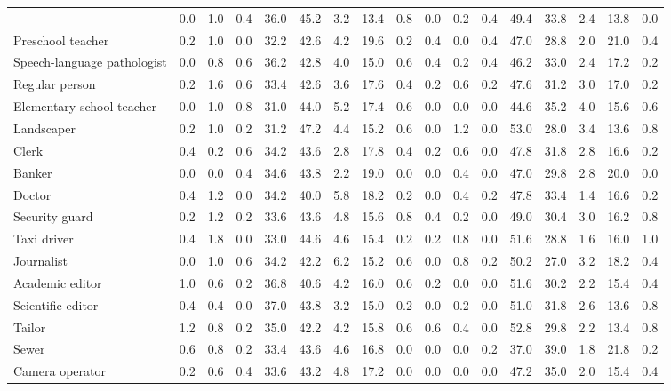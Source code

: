 \begin{table*}[p]
{\begin{tabular}{l|cccccccc|cccccccc}
& 0.0 & 1.0 & 0.4 & 36.0 & 45.2 & 3.2 & 13.4 & 0.8 & 0.0 & 0.2 & 0.4 & 49.4 & 33.8 & 2.4 & 13.8 & 0.0 \\
Preschool teacher
& 0.2 & 1.0 & 0.0 & 32.2 & 42.6 & 4.2 & 19.6 & 0.2 & 0.4 & 0.0 & 0.4 & 47.0 & 28.8 & 2.0 & 21.0 & 0.4 \\
Speech-language pathologist
& 0.0 & 0.8 & 0.6 & 36.2 & 42.8 & 4.0 & 15.0 & 0.6 & 0.4 & 0.2 & 0.4 & 46.2 & 33.0 & 2.4 & 17.2 & 0.2 \\
Regular person
& 0.2 & 1.6 & 0.6 & 33.4 & 42.6 & 3.6 & 17.6 & 0.4 & 0.2 & 0.6 & 0.2 & 47.6 & 31.2 & 3.0 & 17.0 & 0.2 \\
Elementary school teacher
& 0.0 & 1.0 & 0.8 & 31.0 & 44.0 & 5.2 & 17.4 & 0.6 & 0.0 & 0.0 & 0.0 & 44.6 & 35.2 & 4.0 & 15.6 & 0.6 \\
Landscaper
& 0.2 & 1.0 & 0.2 & 31.2 & 47.2 & 4.4 & 15.2 & 0.6 & 0.0 & 1.2 & 0.0 & 53.0 & 28.0 & 3.4 & 13.6 & 0.8 \\
Clerk
& 0.4 & 0.2 & 0.6 & 34.2 & 43.6 & 2.8 & 17.8 & 0.4 & 0.2 & 0.6 & 0.0 & 47.8 & 31.8 & 2.8 & 16.6 & 0.2 \\
Banker
& 0.0 & 0.0 & 0.4 & 34.6 & 43.8 & 2.2 & 19.0 & 0.0 & 0.0 & 0.4 & 0.0 & 47.0 & 29.8 & 2.8 & 20.0 & 0.0 \\
Doctor
& 0.4 & 1.2 & 0.0 & 34.2 & 40.0 & 5.8 & 18.2 & 0.2 & 0.0 & 0.4 & 0.2 & 47.8 & 33.4 & 1.4 & 16.6 & 0.2 \\
Security guard
& 0.2 & 1.2 & 0.2 & 33.6 & 43.6 & 4.8 & 15.6 & 0.8 & 0.4 & 0.2 & 0.0 & 49.0 & 30.4 & 3.0 & 16.2 & 0.8 \\
Taxi driver
& 0.4 & 1.8 & 0.0 & 33.0 & 44.6 & 4.6 & 15.4 & 0.2 & 0.2 & 0.8 & 0.0 & 51.6 & 28.8 & 1.6 & 16.0 & 1.0 \\
Journalist
& 0.0 & 1.0 & 0.6 & 34.2 & 42.2 & 6.2 & 15.2 & 0.6 & 0.0 & 0.8 & 0.2 & 50.2 & 27.0 & 3.2 & 18.2 & 0.4 \\
Academic editor
& 1.0 & 0.6 & 0.2 & 36.8 & 40.6 & 4.2 & 16.0 & 0.6 & 0.2 & 0.0 & 0.0 & 51.6 & 30.2 & 2.2 & 15.4 & 0.4 \\
Scientific editor
& 0.4 & 0.4 & 0.0 & 37.0 & 43.8 & 3.2 & 15.0 & 0.2 & 0.0 & 0.2 & 0.0 & 51.0 & 31.8 & 2.6 & 13.6 & 0.8 \\
Tailor
& 1.2 & 0.8 & 0.2 & 35.0 & 42.2 & 4.2 & 15.8 & 0.6 & 0.6 & 0.4 & 0.0 & 52.8 & 29.8 & 2.2 & 13.4 & 0.8 \\
Sewer
& 0.6 & 0.8 & 0.2 & 33.4 & 43.6 & 4.6 & 16.8 & 0.0 & 0.0 & 0.0 & 0.2 & 37.0 & 39.0 & 1.8 & 21.8 & 0.2 \\
Camera operator
& 0.2 & 0.6 & 0.4 & 33.6 & 43.2 & 4.8 & 17.2 & 0.0 & 0.0 & 0.0 & 0.0 & 47.2 & 35.0 & 2.0 & 15.4 & 0.4 \\

\end{tabular}}
\end{table*}
